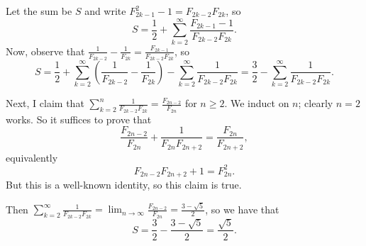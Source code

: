Let the sum be $S$ and write $F_{2k-1}^2-1=F_{2k-2}F_{2k}$, so \[S=\frac{1}{2}+\displaystyle\sum_{k=2}^{\infty}\frac{F_{2k-1}-1}{F_{2k-2}F_{2k}}.\] Now, observe that $\frac{1}{F_{2k-2}}-\frac{1}{F_{2k}}=\frac{F_{2k-1}}{F_{2k-2}F_{2k}}$, so \[S=\frac{1}{2}+\displaystyle\sum_{k=2}^{\infty}\left(\frac{1}{F_{2k-2}}-\frac{1}{F_{2k}}\right)-\displaystyle\sum_{k=2}^{\infty}\frac{1}{F_{2k-2}F_{2k}}=\frac{3}{2}-\displaystyle\sum_{k=2}^{\infty}\frac{1}{F_{2k-2}F_{2k}}.\]

Next, I claim that $\displaystyle\sum_{k=2}^n\frac{1}{F_{2k-2}F_{2k}}=\frac{F_{2n-2}}{F_{2n}}$ for $n\geq2$. We induct on $n$; clearly $n=2$ works. So it suffices to prove that \[\frac{F_{2n-2}}{F_{2n}}+\frac{1}{F_{2n}F_{2n+2}}=\frac{F_{2n}}{F_{2n+2}},\] equivalently \[F_{2n-2}F_{2n+2}+1=F_{2n}^2.\] But this is a well-known identity, so this claim is true.

Then $\displaystyle\sum_{k=2}^{\infty}\frac{1}{F_{2k-2}F_{2k}}=\displaystyle\lim_{n\to\infty}\frac{F_{2n-2}}{F_{2n}}=\frac{3-\sqrt{5}}{2}$, so we have that \[S=\frac{3}{2}-\frac{3-\sqrt{5}}{2}=\boxed{\frac{\sqrt{5}}{2}}.\]